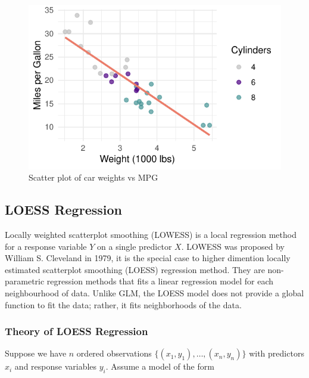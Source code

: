 \documentclass{article}\usepackage[]{graphicx}\usepackage[]{xcolor}
\makeatletter
\def\maxwidth{ %
  \ifdim\Gin@nat@width>\linewidth
    \linewidth
  \else
    \Gin@nat@width
  \fi
}
\newenvironment{knitrout}{}{} %
\numberwithin{equation}{section}
\makeatother
\begin{document}
\begin{knitrout}\scriptsize
{}\color{fgcolor}\begin{figure}[H]

{\centering \includegraphics[width=\maxwidth]{figure/beamer-scatter-plot-1} 

}

\caption[Scatter plot of car weights vs MPG]{Scatter plot of car weights vs MPG}\label{fig:scatter-plot}
\end{figure}

\end{knitrout}

\subsection{LOESS Regression}
\noindent
Locally weighted scatterplot smoothing (LOWESS) is a local regression method for a response variable $Y$ on a single predictor $X$. LOWESS was proposed by William S. Cleveland in 1979, it is the special case to higher dimention locally estimated scatterplot smoothing (LOESS) regression method. They are non-parametric regression methods that fits a linear regression model for each neighbourhood of data. Unlike GLM, the LOESS model does not provide a global function to fit the data; rather, it fits neighborhoods of the data.

\subsubsection{Theory of LOESS Regression}

\noindent
Suppose we have $n$ ordered observations $\{(x_1,y_1), \dots, (x_n,y_n)\}$ with predictors $x_i$ and response variables $y_i$. Assume a model of the form
\end{document}
